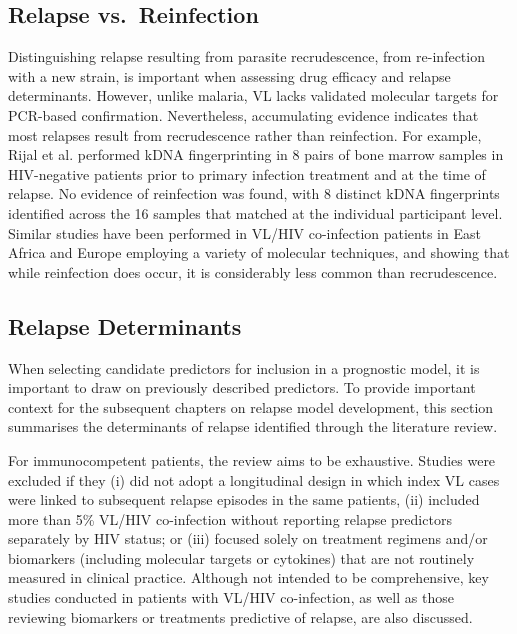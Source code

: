 \subsection{Relapse vs.\ Reinfection}

Distinguishing relapse resulting from parasite recrudescence, from re-infection with a new strain, is important when assessing drug efficacy and relapse determinants. However, unlike malaria\cite{WHO_2009_surveillance_antimalarial_drug_efficacy}, VL lacks validated molecular targets for PCR-based confirmation. Nevertheless, accumulating evidence indicates that most relapses result from recrudescence rather than reinfection. For example, Rijal et al. performed kDNA fingerprinting in 8 pairs of bone marrow samples in HIV-negative patients prior to primary infection treatment and at the time of relapse. No evidence of reinfection was found, with 8 distinct kDNA fingerprints identified across the 16 samples that matched at the individual participant level\cite{rijal2013}. Similar studies have been performed in VL/HIV co-infection patients in East Africa and Europe employing a variety of molecular techniques, and showing that while reinfection does occur, it is considerably less common than recrudescence\cite{franssen2021, morales2002, gelanew2010,lachaud2009}.

\subsection{Relapse Determinants\label{sec:relapse_det}}

When selecting candidate predictors for inclusion in a prognostic model, it is important to draw on previously described predictors\cite{collins2024A}. To provide important context for the subsequent chapters on relapse model development, this section summarises the determinants of relapse identified through the literature review.

For immunocompetent patients, the review aims to be exhaustive. Studies were excluded if they (i) did not adopt a longitudinal design in which index VL cases were linked to subsequent relapse episodes in the same patients, (ii) included more than 5\% VL/HIV co-infection without reporting relapse predictors separately by HIV status; or (iii) focused solely on treatment regimens and/or biomarkers (including molecular targets or cytokines) that are not routinely measured in clinical practice. Although not intended to be comprehensive, key studies conducted in patients with VL/HIV co-infection, as well as those reviewing biomarkers or treatments predictive of relapse, are also discussed.

